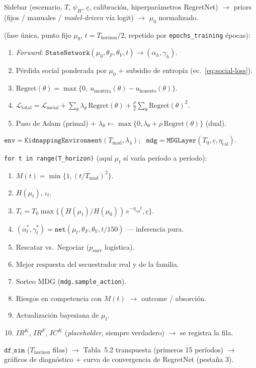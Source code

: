 \documentclass[ecta,nameyear,draft]{econsocart}
\newcommand{\pyvar}[1]{\texttt{#1}}
\begin{document}
\begin{description}[leftmargin=1.6cm, style=nextline]
\item[Entrada] Sidebar (escenario, $T$, $\psi_H$, $\underline{c}$, calibración, hiperparámetros RegretNet) $\rightarrow$ priors (fijos / manuales / \emph{model-driven} vía logit) $\rightarrow$ $\mu_0$ normalizado.
\item[Entrenamiento RegretNet] (fase única, punto fijo $\mu_0$, $t=T_{\mathrm{horizon}}/2$, repetido por \pyvar{epochs\_training} épocas):
\begin{enumerate}[label=(\arabic*), nosep]
\item \emph{Forward}: $\pyvar{StateNetwork}(\mu_0,\theta_F,\theta_V,t) \to (\alpha_h,\gamma_h)$.
\item Pérdida social ponderada por $\mu_0$ + subsidio de entropía (ec.~\eqref{eq:social-loss}).
\item $\mathrm{Regret}(\theta) = \max\{0,\ u_{\mathrm{mentira}}(\theta)-u_{\mathrm{honesto}}(\theta)\}$.
\item $\mathcal{L}_{\mathrm{total}} = \mathcal{L}_{\mathrm{social}} + \sum_\theta \lambda_\theta\,\mathrm{Regret}(\theta) + \tfrac{\rho}{2}\sum_\theta \mathrm{Regret}(\theta)^2$.
\item Paso de Adam (primal) + $\lambda_\theta \leftarrow \max\{0,\lambda_\theta+\rho\,\mathrm{Regret}(\theta)\}$ (dual).
\end{enumerate}
\item[Inicialización del entorno] $\pyvar{env} = \pyvar{KidnappingEnvironment}(T_{\mathrm{mad}},\lambda_4)$; \ $\pyvar{mdg} = \pyvar{MDGLayer}(T_0,\underline{c},\eta_{\mathrm{cal}})$.
\item[Bucle de simulación] \pyvar{for t in range(T\_horizon)} (aquí $\mu_t$ sí varía período a período):
\begin{enumerate}[label=(\arabic*), nosep]
\item $M(t) = \min\{1,(t/T_{\mathrm{mad}})^2\}$.
\item $H(\mu_t)$, $\iota_t$.
\item $T_t = T_0 \max\{(H(\mu_t)/H(\mu_0))\,e^{-\eta_{\mathrm{cal}} t},\underline{c}\}$.
\item $(\alpha_t^\ast,\gamma_t^\ast) = \pyvar{net}(\mu_t,\theta_F,\theta_V,t/150)$ --- inferencia pura.
\item Rescatar vs.\ Negociar ($p_{\mathrm{surv}}$ logística).
\item Mejor respuesta del secuestrador real y de la familia.
\item Sorteo MDG (\pyvar{mdg.sample\_action}).
\item Riesgos en competencia con $M(t)$ $\to$ outcome / absorción.
\item Actualización bayesiana de $\mu_t$.
\item $IR^K$, $IR^F$, $IC^K$ (\emph{placeholder}, siempre verdadero) $\to$ se registra la fila.
\end{enumerate}
\item[Salida] $\pyvar{df\_sim}$ ($T_{\mathrm{horizon}}$ filas) $\to$ Tabla~5.2 transpuesta (primeros 15 períodos) $\to$ gráficos de diagnóstico + curva de convergencia de RegretNet (pestaña 3).
\end{description}
\end{document}
